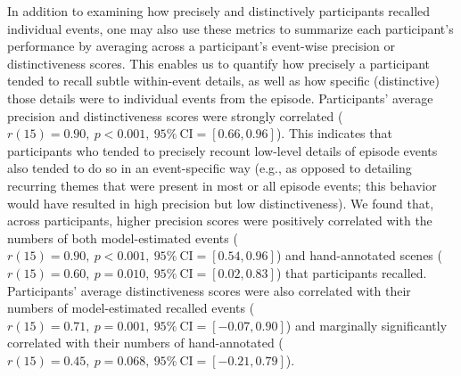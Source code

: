 \documentclass[10pt]{article}
\begin{document}
In addition to examining how precisely and distinctively participants recalled individual events, one may also use these metrics to summarize each participant's performance by averaging across a participant's event-wise precision or distinctiveness scores.  This enables us to quantify how precisely a participant tended to recall subtle within-event details, as well as how specific (distinctive) those details were to individual events from the episode.  Participants' average precision and distinctiveness scores were strongly correlated ($r(15) = 0.90,~p < 0.001,~95\%~\mathrm{CI} = [0.66, 0.96]$).  This indicates that participants who tended to precisely recount low-level details of episode events also tended to do so in an event-specific way (e.g., as opposed to detailing recurring themes that were present in most or all episode events; this behavior would have resulted in high precision but low distinctiveness).  We found that, across participants, higher precision scores were positively correlated with the numbers of both model-estimated events ($r(15) = 0.90,~p < 0.001,~95\%~\mathrm{CI} = [0.54, 0.96]$) and hand-annotated scenes ($r(15) = 0.60,~p = 0.010,~95\%~\mathrm{CI} = [0.02, 0.83]$) that participants recalled.  Participants' average distinctiveness scores were also correlated with their numbers of model-estimated recalled events ($r(15) = 0.71,~p = 0.001,~95\%~\mathrm{CI} = [-0.07, 0.90]$) and marginally significantly correlated with their numbers of hand-annotated ($r(15) = 0.45,~p = 0.068,~95\%~\mathrm{CI} = [-0.21, 0.79]$).
\end{document}
